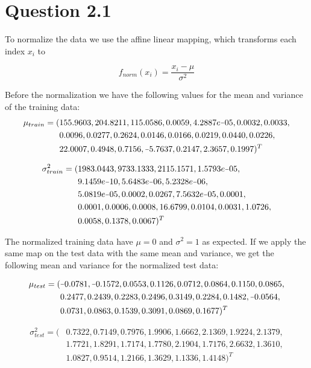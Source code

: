 \documentclass[11pt,a4paper]{article}
\newcommand*{\matminus}{%
  \leavevmode
  \hphantom{0}%
  \llap{%
    \settowidth{\dimen0 }{$0$}%
    \resizebox{\dimen0 }{\height}{$-$}%
  }%
}
\begin{document}
\section{Question 2.1}
To normalize the data we use the affine linear mapping, which transforms each index $x_i$ to

$$ f_{norm}(x_i) = \frac{x_i - \mu}{\sigma^2} $$

Before the normalization we have the following values for the mean and variance of the training data:
\begin{align}
\mu_{train} =  (&155.9603,204.8211,115.0586,0.0059,4.2887e\matminus05,0.0032,0.0033, \\
                &0.0096,0.0277,0.2624,0.0146,0.0166,0.0219,0.0440,0.0226, \\
                &22.0007,0.4948,0.7156,\matminus5.7637,0.2147,2.3657,0.1997)^T
\end{align}

\begin{align}
\sigma^2_{train} = (&1983.0443,9733.1333,2115.1571,1.5793e\matminus05,\\
                    &9.1459e\matminus10,5.6483e\matminus06,5.2328e\matminus06, \\
                    &5.0819e\matminus05,0.0002,0.0267,7.5632e\matminus05,0.0001, \\
                    &0.0001,0.0006,0.0008,16.6799,0.0104,0.0031,1.0726, \\
                    &0.0058,0.1378,0.0067)^T
\end{align}


The normalized training data have $\mu = 0$ and $\sigma^2 = 1$ as expected. If we apply
the same map on the test data with the same mean and variance, we get the following mean
and variance for the normalized test data:

\begin{align} 
\mu_{test} = (&\matminus0.0781,\matminus0.1572,0.0553,0.1126,0.0712,0.0864,0.1150,0.0865, \\
              &0.2477,0.2439,0.2283,0.2496,0.3149,0.2284,0.1482,\matminus0.0564, \\
              &0.0731,0.0863,0.1539,0.3091,0.0869,0.1677)^T
\end{align}

\begin{align}
  \sigma^2_{test} = (&0.7322,0.7149,0.7976,1.9906,1.6662,2.1369,1.9224,2.1379, \\
                     &1.7721,1.8291,1.7174,1.7780,2.1904,1.7176,2.6632,1.3610, \\
                     &1.0827,0.9514,1.2166,1.3629,1.1336,1.4148)^T
\end{align}
\end{document}
